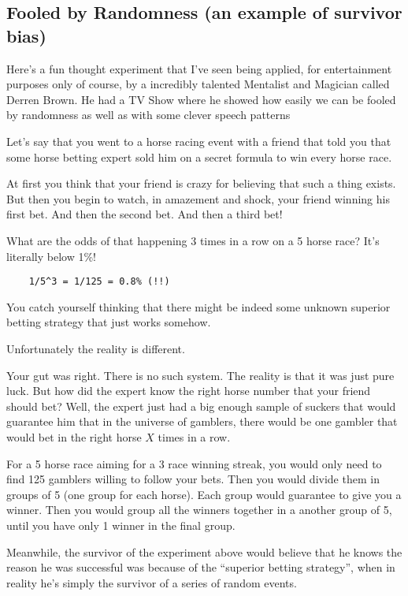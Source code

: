 \subsection{Fooled by Randomness (an example of survivor bias)}

Here's a fun thought experiment that I've seen being applied, for entertainment purposes only of course, by a incredibly talented Mentalist and Magician called Derren Brown. He had a TV Show where he showed how easily we can be fooled by randomness as well as with some clever speech patterns

Let's say that you went to a horse racing event with a friend that told you that some horse betting expert sold him on a secret formula to win every horse race. 

At first you think that your friend is crazy for believing that such a thing exists.
But then you begin to watch, in amazement and shock, your friend winning his first bet. And then the second bet. And then a third bet! 

What are the odds of that happening 3 times in a row on a 5 horse race? It's literally below 1\%!

\begin{lstlisting}
	1/5^3 = 1/125 = 0.8% (!!)
\end{lstlisting}

You catch yourself thinking that there might be indeed some unknown superior betting strategy that just works somehow.

Unfortunately the reality is different.

Your gut was right. There is no such system. The reality is that it was just pure luck. 
But how did the expert know the right horse number that your friend should bet? 
Well, the expert just had a big enough sample of suckers that would guarantee him that in the universe of gamblers, there would be one gambler that would bet in the right horse $X$ times in a row. 

For a 5 horse race aiming for a 3 race winning streak, you would only need to find 125 gamblers willing to follow your bets. Then you would divide them in groups of 5 (one group for each horse). Each group would guarantee to give you a winner. Then you would group all the winners together in a another group of 5, until you have only 1 winner in the final group.

Meanwhile, the survivor of the experiment above would believe that he knows the reason he was successful was because of the ``superior betting strategy'', when in reality he's simply the survivor of a series of random events.

